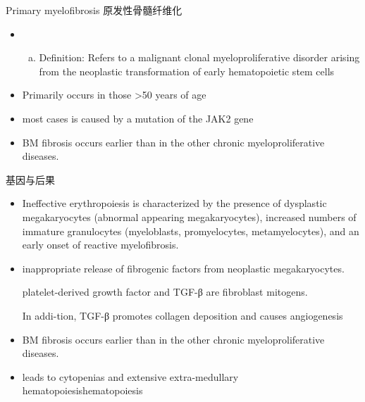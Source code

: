 \documentclass[
  ignorenonframetext,
]{beamer}
\providecommand{\tightlist}{%
  \setlength{\itemsep}{0pt}\setlength{\parskip}{0pt}}
\begin{document}
\begin{frame}
\begin{block}{Primary myelofibrosis 原发性骨髓纤维化}
\protect\hypertarget{primary-myelofibrosis-ux539fux53d1ux6027ux9aa8ux9ad3ux7ea4ux7ef4ux5316}{}
\begin{itemize}
\item
  \begin{enumerate}
  [a.]
  \tightlist
  \item
    Definition: Refers to a malignant clonal myeloproliferative disorder
    arising from the neoplastic transformation of early hematopoietic
    stem cells
  \end{enumerate}
\item
  Primarily occurs in those \textgreater50 years of age
\item
  most cases is caused by a mutation of the JAK2 gene
\item
  BM fibrosis occurs earlier than in the other chronic
  myeloproliferative diseases.
\end{itemize}
\end{block}
\end{frame}

\begin{frame}
\begin{block}{基因与后果}
\protect\hypertarget{ux57faux56e0ux4e0eux540eux679c-2}{}
\begin{itemize}
\item
  Ineffective erythropoiesis is characterized by the presence of
  dysplastic megakaryocytes (abnormal appearing megakaryocytes),
  increased numbers of immature granulocytes (myeloblasts,
  promyelocytes, metamyelocytes), and an early onset of reactive
  myelofibrosis.
\item
  inappropriate release of fibrogenic factors from neoplastic
  megakaryocytes.

  platelet-derived growth factor and TGF-β are fibroblast mitogens.

  In addi-tion, TGF-β promotes collagen deposition and causes
  angiogenesis
\item
  BM fibrosis occurs earlier than in the other chronic
  myeloproliferative diseases.
\item
  leads to cytopenias and extensive extra-medullary
  hematopoiesishematopoiesis
\end{itemize}
\end{block}
\end{frame}
\end{document}
